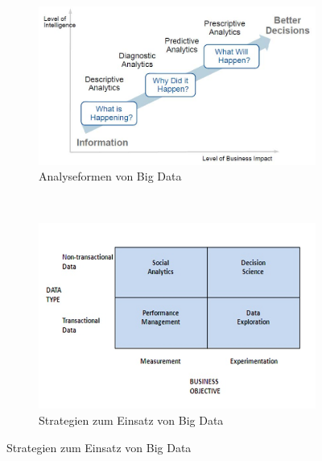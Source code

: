 \begin{figure}[h!]
	\centering
	\begin{subfigure}[b]{0.4\textwidth}
		\includegraphics[width=\textwidth]{fig/analyseformen}
		\caption{Analyseformen von Big Data}
		\label{fig:analyseformen}
	\end{subfigure}
	~
	\begin{subfigure}[b]{0.4\textwidth}
		\includegraphics[width=\textwidth]{fig/strategy_bigdata}
		\caption{Strategien zum Einsatz von Big Data}
		\label{fig:strategy_bigdata}
	\end{subfigure}
\end{figure}
